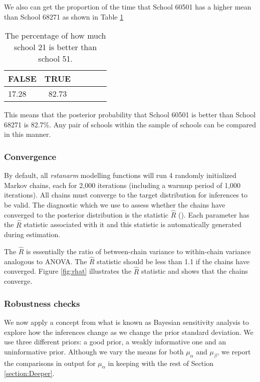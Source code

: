 We also can get the proportion of the time that School 60501 has a higher mean than School 68271 as shown in Table \ref{tab:comparison}

\begin{table}[ht]
	\centering
	\def\arraystretch{1.3}
	{\small
		\begin{tabular}{l | c c c c c}
			FALSE & TRUE \\
			\hline
			17.28 & 82.73
		\end{tabular}
	}
	\caption{{\small The percentage of how much school 21 is better than school 51.}}
	\label{tab:comparison}
\end{table}

This means that the posterior probability that School 60501 is better than School 68271 is 82.7\%. Any pair of schools within the sample of schools can be compared in this manner.

\subsubsection{Convergence}
By default, all \textit{rstanarm} modelling functions will run 4 randomly initialized Markov chains, each for 2,000 iterations (including a warmup period of 1,000 iterations). All chains must converge to the target distribution for inferences to be valid. The diagnostic which we use to assess whether the chains have converged to the posterior distribution is the statistic $\hat{R}$ (\cite{gelman1992inference}). Each parameter has the $\hat{R}$ statistic associated with it and this statistic is automatically generated during estimation.


The $\hat{R}$ is essentially the ratio of between-chain variance to within-chain variance analogous to ANOVA. The $\hat{R}$ statistic should be less than 1.1 if the chains have converged. Figure \ref{fig:rhat} illustrates the $\hat{R}$ statistic and shows that the chains converge.


\subsubsection{Robustness checks}

We now apply a concept from what is known as Bayesian sensitivity analysis to explore how the inferences change as we change the prior standard deviation. We use three different priors: a good prior, a weakly informative one and an uninformative prior. Although we vary the means for both $\mu_{\alpha}$ and $\mu_{\beta}$, we report the comparisons in output for $\mu_{\alpha}$ in keeping with the rest of Section \ref{section:Deeper}.


